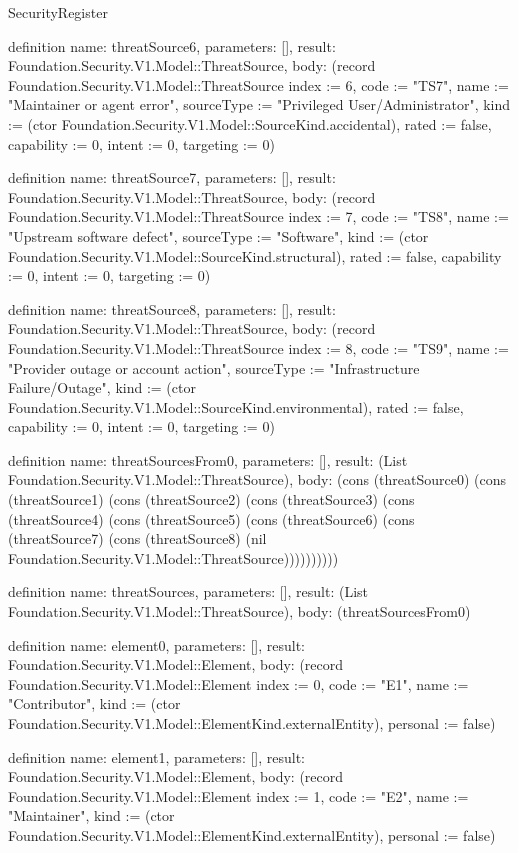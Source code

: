 \begin{lexlean}{SecurityRegister}
\begin{semanticmodule}
definition{
  name: threatSource6,
  parameters: [],
  result: Foundation.Security.V1.Model::ThreatSource,
  body: (record Foundation.Security.V1.Model::ThreatSource {index := 6, code := "TS7", name := "Maintainer or agent error", sourceType := "Privileged User/Administrator", kind := (ctor Foundation.Security.V1.Model::SourceKind.accidental), rated := false, capability := 0, intent := 0, targeting := 0})
}

definition{
  name: threatSource7,
  parameters: [],
  result: Foundation.Security.V1.Model::ThreatSource,
  body: (record Foundation.Security.V1.Model::ThreatSource {index := 7, code := "TS8", name := "Upstream software defect", sourceType := "Software", kind := (ctor Foundation.Security.V1.Model::SourceKind.structural), rated := false, capability := 0, intent := 0, targeting := 0})
}

definition{
  name: threatSource8,
  parameters: [],
  result: Foundation.Security.V1.Model::ThreatSource,
  body: (record Foundation.Security.V1.Model::ThreatSource {index := 8, code := "TS9", name := "Provider outage or account action", sourceType := "Infrastructure Failure/Outage", kind := (ctor Foundation.Security.V1.Model::SourceKind.environmental), rated := false, capability := 0, intent := 0, targeting := 0})
}

definition{
  name: threatSourcesFrom0,
  parameters: [],
  result: (List Foundation.Security.V1.Model::ThreatSource),
  body: (cons (threatSource0) (cons (threatSource1) (cons (threatSource2) (cons (threatSource3) (cons (threatSource4) (cons (threatSource5) (cons (threatSource6) (cons (threatSource7) (cons (threatSource8) (nil Foundation.Security.V1.Model::ThreatSource))))))))))
}

definition{
  name: threatSources,
  parameters: [],
  result: (List Foundation.Security.V1.Model::ThreatSource),
  body: (threatSourcesFrom0)
}

definition{
  name: element0,
  parameters: [],
  result: Foundation.Security.V1.Model::Element,
  body: (record Foundation.Security.V1.Model::Element {index := 0, code := "E1", name := "Contributor", kind := (ctor Foundation.Security.V1.Model::ElementKind.externalEntity), personal := false})
}

definition{
  name: element1,
  parameters: [],
  result: Foundation.Security.V1.Model::Element,
  body: (record Foundation.Security.V1.Model::Element {index := 1, code := "E2", name := "Maintainer", kind := (ctor Foundation.Security.V1.Model::ElementKind.externalEntity), personal := false})
}


\end{semanticmodule}
\end{lexlean}

